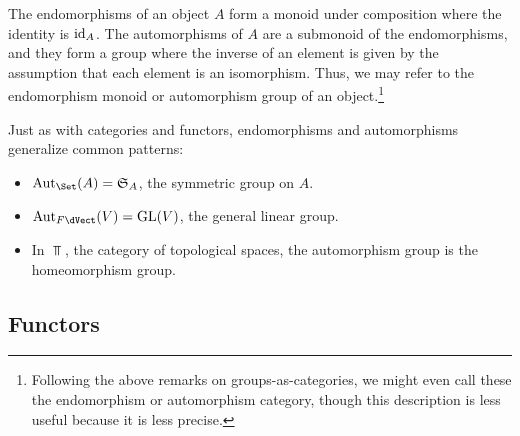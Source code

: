 \documentclass[a5paper]{article}
\begin{document}
\begin{remark*}
  The endomorphisms of an object $A$ form a monoid under composition where the
  identity is $\operatorname{id}_A$. The automorphisms of $A$ are a submonoid of the
  endomorphisms, and they form a group where the inverse of an element is given
  by the assumption that each element is an isomorphism.
  Thus, we may refer to the endomorphism monoid or automorphism group of an
  object.\footnote{Following the above remarks on groups-as-categories, we might
    even call these the endomorphism or automorphism category, though this
    description is less useful because it is less precise.}
\end{remark*}

\begin{example*}
  Just as with categories and functors, endomorphisms and automorphisms generalize
  common patterns:
  \begin{itemize}
    \itemsep-0.2em
    \item $\Aut_{\Set}(A)=\S_A$, the symmetric group on $A$.
    \item $\Aut_{F\dVect}(V)=\GL(V)$, the general linear group.
    \item In $\Top$, the category of topological spaces, the automorphism group
      is the homeomorphism group.
  \end{itemize}
\end{example*}

\subsection{Functors}
\label{subsec:functors}

\end{document}
